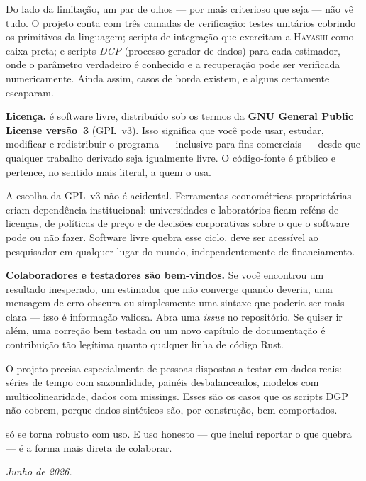 Do lado da limitação, um par de olhos — por mais criterioso que seja — não vê tudo.
O projeto conta com três camadas de verificação: testes unitários cobrindo os
primitivos da linguagem; scripts de integração que exercitam a \textsc{Hayashi} como
caixa preta; e scripts \textit{DGP} (processo gerador de dados) para cada estimador,
onde o parâmetro verdadeiro é conhecido e a recuperação pode ser verificada
numericamente. Ainda assim, casos de borda existem, e alguns certamente escaparam.

\bigskip

\noindent\textbf{Licença.} \hayashi{} é software livre, distribuído sob os termos da
\textbf{GNU General Public License versão~3} (GPL~v3). Isso significa que você pode
usar, estudar, modificar e redistribuir o programa — inclusive para fins comerciais —
desde que qualquer trabalho derivado seja igualmente livre. O código-fonte é público
e pertence, no sentido mais literal, a quem o usa.

A escolha da GPL~v3 não é acidental. Ferramentas econométricas proprietárias criam
dependência institucional: universidades e laboratórios ficam reféns de licenças, de
políticas de preço e de decisões corporativas sobre o que o software pode ou não fazer.
Software livre quebra esse ciclo. \hayashi{} deve ser acessível ao pesquisador em
qualquer lugar do mundo, independentemente de financiamento.

\bigskip

\noindent\textbf{Colaboradores e testadores são bem-vindos.} Se você encontrou um
resultado inesperado, um estimador que não converge quando deveria, uma mensagem de
erro obscura ou simplesmente uma sintaxe que poderia ser mais clara — isso é
informação valiosa. Abra uma \textit{issue} no repositório. Se quiser ir além, uma
correção bem testada ou um novo capítulo de documentação é contribuição tão legítima
quanto qualquer linha de código Rust.

O projeto precisa especialmente de pessoas dispostas a testar \hayashi{} em dados
reais: séries de tempo com sazonalidade, painéis desbalanceados, modelos com
multicolinearidade, dados com missings. Esses são os casos que os scripts DGP não
cobrem, porque dados sintéticos são, por construção, bem-comportados.

\hayashi{} só se torna robusto com uso. E uso honesto — que inclui reportar o que
quebra — é a forma mais direta de colaborar.

\bigskip

\noindent\textit{Junho de 2026.}
